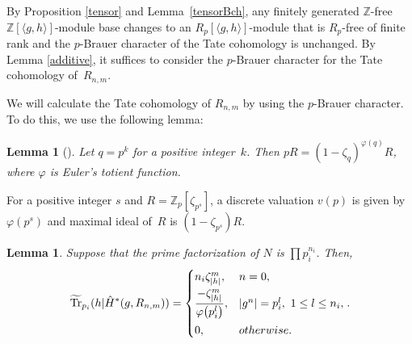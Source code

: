 \documentclass[pdftex]{sigma}%
\numberwithin{equation}{section}
\newtheorem{Lemma}[Theorem]{Lemma}
\begin{document}
By Proposition \ref{tensor} and Lemma~\ref{tensorBch}, any finitely generated $\mathbb{Z}$-free $\mathbb{Z}[\langle g,h \rangle]$-module base changes to an $R_p[\langle g,h \rangle]$-module that is $R_p$-free of finite rank and the $p$-Brauer character of the Tate cohomology is unchanged.
By Lemma \ref{additive}, it suffices to consider the $p$-Brauer character for the Tate cohomology of~$R_{n,m}$.

We will calculate the Tate cohomology of $R_{n,m}$ by using the $p$-Brauer character. To do this, we use the following lemma:

\begin{Lemma}[{\cite[Chapter III, Lemma 3]{CF}}] \label{pR}
 Let $q=p^k$ for a positive integer~$k$. Then $pR=(1-\zeta_q)^{\varphi(q)}R$, where $\varphi$ is Euler's totient function.
\end{Lemma}

For a positive integer $s$ and $R=\mathbb{Z}_{p}[\zeta_{p^s}]$, a discrete valuation $v(p)$ is given by $\varphi(p^s)$ and maximal ideal of~$R$ is $(1-\zeta_{p^s})R$.

\begin{Lemma}\label{Bch}
Suppose that the prime factorization of $N$ is $\prod p_i^{n_i}$.
Then,
\[
\widetilde{\operatorname{Tr}}_{p_i}(h|\hat{H}^*(g,R_{n,m}))= \begin{cases}
n_i\zeta_{|h|}^m, & n=0, \vspace{1mm}\\
\dfrac{-\zeta_{|h|}^m}{\varphi \big(p_i^l\big)}, & |g^n|=p_i^l, \ 1\leq l\leq n_i, \vspace{1mm}\\
0, & otherwise.
\end{cases}.
\]
\end{Lemma}
\end{document}
